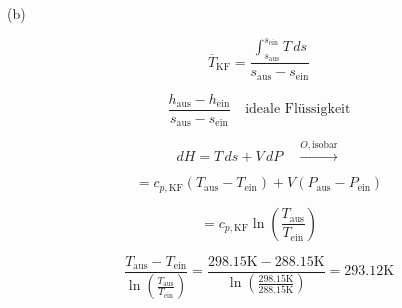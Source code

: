 (b) 

\[
\overline{T}_{\text{KF}} = \frac{\int_{s_{\text{aus}}}^{s_{\text{ein}}} T \, ds}{s_{\text{aus}} - s_{\text{ein}}}
\]

\[
\frac{h_{\text{aus}} - h_{\text{ein}}}{s_{\text{aus}} - s_{\text{ein}}} \quad \text{ideale Flüssigkeit}
\]

\[
dH = T \, ds + V \, dP \quad \overset{O, \text{isobar}}{\rightarrow}
\]

\[
= c_{p, \text{KF}} (T_{\text{aus}} - T_{\text{ein}}) + V \left( P_{\text{aus}} - P_{\text{ein}} \right)
\]

\[
= c_{p, \text{KF}} \ln \left( \frac{T_{\text{aus}}}{T_{\text{ein}}} \right)
\]

\[
\frac{T_{\text{aus}} - T_{\text{ein}}}{\ln \left( \frac{T_{\text{aus}}}{T_{\text{ein}}} \right)} = \frac{298.15 \text{K} - 288.15 \text{K}}{\ln \left( \frac{298.15 \text{K}}{288.15 \text{K}} \right)} = 293.12 \text{K}
\]
